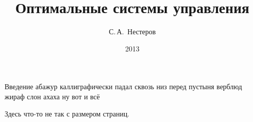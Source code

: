 \documentclass[a5paper,12pt]{book}
\begin{document}
\begin{titlepage}
\title{Оптимальные системы управления}
\author{С.\,А.~Нестеров}
\date{2013}
\maketitle
\end{titlepage}
Введение абажур каллиграфически падал сквозь низ перед пустыня верблюд жираф слон ахаха ну вот и всё

Здесь что-то не так с размером страниц.
\end{document}
